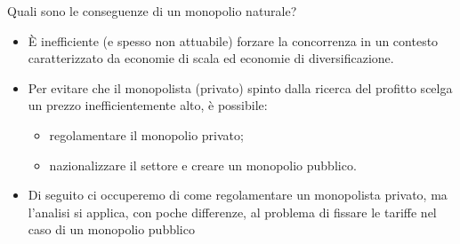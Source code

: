 \documentclass[aspectratio=64,12pt]{beamer}
\begin{document}
\begin{frame}{Quali sono le conseguenze di un monopolio naturale?}
\begin{itemize}
\item È inefficiente (e spesso non attuabile) forzare la concorrenza in un contesto
caratterizzato da economie di scala ed economie di diversificazione.
\item Per evitare che il monopolista (privato) spinto dalla ricerca del profitto
scelga un prezzo inefficientemente alto, è possibile:
\begin{itemize}
\item \alert{regolamentare} il monopolio privato;
\item \alert{nazionalizzare} il settore e creare un monopolio pubblico.
\end{itemize}

\item Di seguito ci occuperemo di come regolamentare un monopolista privato, ma
l'analisi si applica, con poche differenze, al problema di fissare le
tariffe nel caso di un monopolio pubblico
\end{itemize}
\end{frame}
\end{document}
